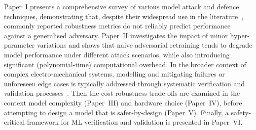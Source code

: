 Paper~I presents a comprehensive survey of various model attack and defence techniques, demonstrating that, despite their widespread use in the literature~\cite{meyers}, commonly reported robustness metrics do not reliably predict performance against a generalised adversary. 
Paper~II investigates the impact of minor hyper-parameter variations and shows that naive adversarial retraining tends to degrade model performance under different attack scenarios, while also introducing significant (polynomial-time) computational overhead. 
In the broader context of complex electro-mechanical systems, modelling and mitigating failures or unforeseen edge cases is typically addressed through systematic verification and validation processes~\cite{iso26262}.
Then the cost-robustness trade-offs are examined in the context model complexity (Paper~III) and hardware choice (Paper~IV), before attempting to design a model that is safer-by-design (Paper~V).
Finally, a safety-critical framework for ML verification and validation is presented in Paper~VI\@.














